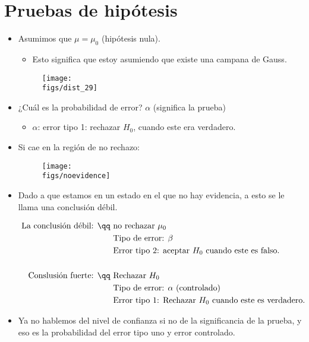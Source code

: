 \section{Pruebas de hipótesis}
\begin{itemize}
    \item Asumimos que $\mu=\mu_0$ (hipótesis nula).
        \begin{itemize}
            \item Esto significa que estoy asumiendo que existe una campana de Gauss.
        \end{itemize}
        \begin{figure}[H]
            \centering
            \texttt{[image: \\figs/dist\_29]} 
        \end{figure}
    
    \item ¿Cuál es la probabilidad de error? $\alpha$ (significa la prueba) 
        \begin{itemize}
            \item $\alpha$: error tipo 1: rechazar $H_0$, cuando este era verdadero.
        \end{itemize}
    
    \item Si cae en la región de no rechazo: 
        \begin{figure}[H]
            \centering
            \texttt{[image: \\figs/noevidence]} 
        \end{figure}
    
    \item Dado a que estamos en un estado en el que no hay evidencia, a esto se le llama una conclusión débil.
        \begin{center}
           \begin{align*}
                \text{ La conclusión débil: } \qq & \text{ no rechazar $\mu_0$ } \\ 
                & \text{ Tipo de error: $\beta$  } \\ 
                & \text{ Error tipo 2: aceptar $H_0$  cuando este es falso.} \\  
                \\ 
                \text{ Conslusión fuerte: } \qq & \text{ Rechazar $H_0$  } \\ 
                & \text{ Tipo de error: $\alpha$ (controlado) } \\ 
                & \text{ Error tipo 1: Rechazar $H_0$ cuando este es verdadero.  } \\ 
           \end{align*}
        \end{center}
    
    \item Ya no hablemos del nivel de confianza si no de la significancia de la prueba, y eso es la probabilidad del error tipo uno y error controlado.
\end{itemize}


